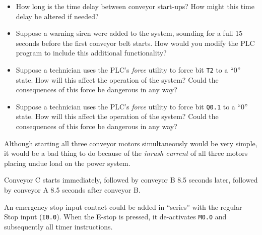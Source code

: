 \begin{itemize}
\item{} How long is the time delay between conveyor start-ups?  How might this time delay be altered if needed?
\item{} Suppose a warning siren were added to the system, sounding for a full 15 seconds before the first conveyor belt starts.  How would you modify the PLC program to include this additional functionality?
\item{} Suppose a technician uses the PLC's {\it force} utility to force bit {\tt T2} to a ``0'' state.  How will this affect the operation of the system?  Could the consequences of this force be dangerous in any way?
\item{} Suppose a technician uses the PLC's {\it force} utility to force bit {\tt Q0.1} to a ``0'' state.  How will this affect the operation of the system?  Could the consequences of this force be dangerous in any way?
\end{itemize}







Although starting all three conveyor motors simultaneously would be very simple, it would be a bad thing to do because of the {\it inrush current} of all three motors placing undue load on the power system.







Conveyor C starts immediately, followed by conveyor B 8.5 seconds later, followed by conveyor A 8.5 seconds after conveyor B.

\vskip 10pt

An emergency stop input contact could be added in ``series'' with the regular Stop input ({\tt I0.0}).  When the E-stop is pressed, it de-activates {\tt M0.0} and subsequently all timer instructions.



